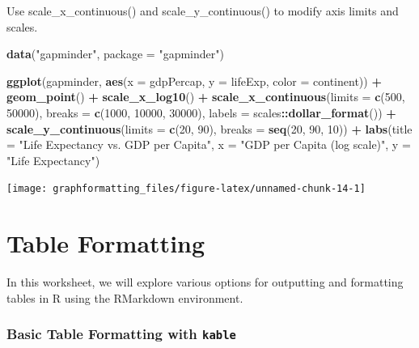 \documentclass[
]{book}
\newenvironment{Shaded}{\begin{snugshade}}{\end{snugshade}}
\newcommand{\AttributeTok}[1]{\textcolor[rgb]{0.13,0.29,0.53}{#1}}
\newcommand{\DecValTok}[1]{\textcolor[rgb]{0.00,0.00,0.81}{#1}}
\newcommand{\FunctionTok}[1]{\textcolor[rgb]{0.13,0.29,0.53}{\textbf{#1}}}
\newcommand{\NormalTok}[1]{#1}
\newcommand{\SpecialCharTok}[1]{\textcolor[rgb]{0.81,0.36,0.00}{\textbf{#1}}}
\newcommand{\StringTok}[1]{\textcolor[rgb]{0.31,0.60,0.02}{#1}}
\begin{document}
Use scale\_x\_continuous() and scale\_y\_continuous() to modify axis limits and scales.

\begin{Shaded}
\begin{Highlighting}[]
\FunctionTok{data}\NormalTok{(}\StringTok{"gapminder"}\NormalTok{, }\AttributeTok{package =} \StringTok{"gapminder"}\NormalTok{)}

\FunctionTok{ggplot}\NormalTok{(gapminder, }\FunctionTok{aes}\NormalTok{(}\AttributeTok{x =}\NormalTok{ gdpPercap, }\AttributeTok{y =}\NormalTok{ lifeExp, }\AttributeTok{color =}\NormalTok{ continent)) }\SpecialCharTok{+}
  \FunctionTok{geom\_point}\NormalTok{() }\SpecialCharTok{+}
  \FunctionTok{scale\_x\_log10}\NormalTok{() }\SpecialCharTok{+}
  \FunctionTok{scale\_x\_continuous}\NormalTok{(}\AttributeTok{limits =} \FunctionTok{c}\NormalTok{(}\DecValTok{500}\NormalTok{, }\DecValTok{50000}\NormalTok{), }\AttributeTok{breaks =} \FunctionTok{c}\NormalTok{(}\DecValTok{1000}\NormalTok{, }\DecValTok{10000}\NormalTok{, }\DecValTok{30000}\NormalTok{), }\AttributeTok{labels =}\NormalTok{ scales}\SpecialCharTok{::}\FunctionTok{dollar\_format}\NormalTok{()) }\SpecialCharTok{+}
  \FunctionTok{scale\_y\_continuous}\NormalTok{(}\AttributeTok{limits =} \FunctionTok{c}\NormalTok{(}\DecValTok{20}\NormalTok{, }\DecValTok{90}\NormalTok{), }\AttributeTok{breaks =} \FunctionTok{seq}\NormalTok{(}\DecValTok{20}\NormalTok{, }\DecValTok{90}\NormalTok{, }\DecValTok{10}\NormalTok{)) }\SpecialCharTok{+}
  \FunctionTok{labs}\NormalTok{(}\AttributeTok{title =} \StringTok{"Life Expectancy vs. GDP per Capita"}\NormalTok{,}
       \AttributeTok{x =} \StringTok{"GDP per Capita (log scale)"}\NormalTok{,}
       \AttributeTok{y =} \StringTok{"Life Expectancy"}\NormalTok{)}
\end{Highlighting}
\end{Shaded}

\texttt{[image: graphformatting\_files/figure-latex/unnamed-chunk-14-1]}

\hypertarget{table-formatting}{%
\chapter{Table Formatting}\label{table-formatting}}

In this worksheet, we will explore various options for outputting and formatting tables in R using the RMarkdown environment.

\hypertarget{basic-table-formatting-with-kable}{%
\subsection{\texorpdfstring{Basic Table Formatting with \texttt{kable}}{Basic Table Formatting with kable}}\label{basic-table-formatting-with-kable}}
\end{document}
